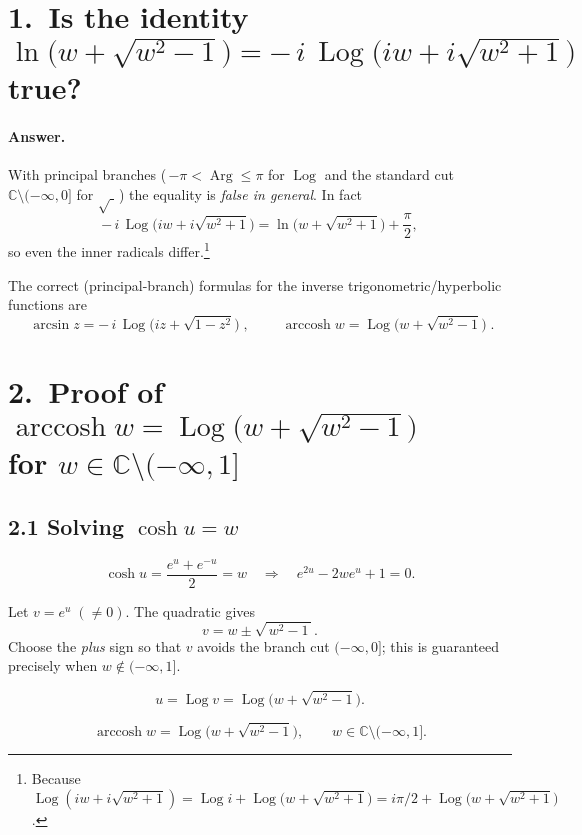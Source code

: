 \documentclass[12pt]{article}
\DeclareMathOperator{\Log}{Log}
\DeclareMathOperator{\Arg}{Arg}
\theoremstyle{definition} %
\theoremstyle{plain} %
\begin{document}
\section*{1.\,  Is the identity
  $\displaystyle\ln\!\bigl(w+\sqrt{w^{2}-1}\bigr)
                     =-\,i\,\Log\!\bigl(iw+i\sqrt{w^{2}+1}\bigr)$
  true?}

\paragraph{Answer.}
With principal branches
(\,$-\pi<\Arg\le\pi$ for $\Log$ and the standard cut
$\mathbb{C}\setminus(-\infty,0]$ for $\sqrt{\;}$\,) the equality is \emph{false
in general}.  In fact
\[
-\,i\,\Log\!\bigl(iw+i\sqrt{w^{2}+1}\bigr)
   =\ln\!\bigl(w+\sqrt{w^{2}+1}\bigr)+\frac{\pi}{2},
\]
so even the inner radicals differ.\footnote{%
Because $\Log(iw+i\sqrt{w^{2}+1})
        =\Log i + \Log\!\bigl(w+\sqrt{w^{2}+1}\bigr)
        = i\pi/2 + \Log\!\bigl(w+\sqrt{w^{2}+1}\bigr)$.}

The correct (principal-branch) formulas for the inverse
trigonometric/hyperbolic functions are
\[
\boxed{\;
   \arcsin z
   =-\,i\,\Log\!\bigl( iz+\sqrt{1-z^{2}}\bigr)
 \;},\qquad
\boxed{\;
   \operatorname{arccosh} w
   =\Log\!\bigl(w+\sqrt{w^{2}-1}\bigr)
 \;}.
\]

\bigskip

\section*{2.\,  Proof of
  $\displaystyle\operatorname{arccosh}w
     =\Log\!\bigl(w+\sqrt{w^{2}-1}\bigr)$ \\
  for $w\in\mathbb{C}\setminus(-\infty,1]$}

\subsection*{2.1  Solving $\cosh u = w$}

\[
\cosh u = \frac{e^{u}+e^{-u}}{2}=w
  \quad\Longrightarrow\quad
  e^{2u}-2we^{u}+1=0.
\]

Let \(v=e^{u}\;(\neq0)\).  The quadratic gives
\[
v= w\pm\sqrt{\,w^{2}-1\,}.
\]
Choose the \emph{plus} sign so that \(v\) avoids the branch cut
\((-\infty,0]\); this is guaranteed precisely when
\(w\notin(-\infty,1]\).

\[
u=\Log v = \Log\!\bigl(w+\sqrt{w^{2}-1}\bigr).
\]

\[
\boxed{\;
   \operatorname{arccosh}w
   = \Log\!\bigl(w+\sqrt{w^{2}-1}\bigr),
   \qquad
   w\in\mathbb{C}\setminus(-\infty,1].
 \;}
\]
\end{document}
